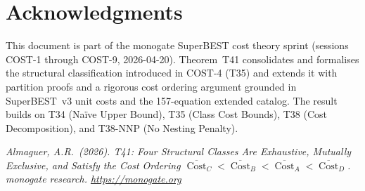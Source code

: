 \documentclass[12pt,a4paper]{article}
\theoremstyle{definition}
\newcommand{\Cost}{\operatorname{Cost}}
\begin{document}
\section*{Acknowledgments}

This document is part of the monogate SuperBEST cost theory sprint
(sessions COST-1 through COST-9, 2026-04-20).
Theorem~T41 consolidates and formalises the structural classification
introduced in COST-4 (T35) and extends it with partition proofs and a
rigorous cost ordering argument grounded in SuperBEST~v3 unit costs and
the 157-equation extended catalog.
The result builds on T34 (Na\"{i}ve Upper Bound), T35 (Class Cost
Bounds), T38 (Cost Decomposition), and T38-NNP (No Nesting Penalty).

\bigskip
\noindent\textit{Almaguer, A.R.\ (2026).
T41: Four Structural Classes Are Exhaustive, Mutually Exclusive, and
Satisfy the Cost Ordering $\overline{\Cost}_C < \overline{\Cost}_B
< \overline{\Cost}_A < \overline{\Cost}_D$.
monogate research. \url{https://monogate.org}}
\end{document}
